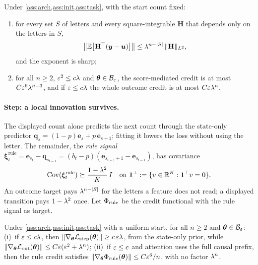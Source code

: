 \begin{lemma}
\label{thm:main}
Under \cref{ass:arch,ass:init,ass:task}, with the start count fixed:
\begin{enumerate}[label=(\roman*),leftmargin=*,itemsep=0pt,topsep=2pt]
\item for every set $S$ of letters and every square-integrable $\mathbf H$ that depends only on the letters in $S$,
\begin{equation}
 \bigl\|\mathbb E\bigl[\mathbf H^\top(\bm y-\bm u)\bigr]\bigr\|\le\lambda^{n-|S|}\,\|\mathbf H\|_{L^2},
 \label{eq:credit-degree}
\end{equation}
and the exponent is sharp;
\item for all $n\ge2$, $\varepsilon^2\le c\lambda$ and $\bm\theta\in\mathcal B_{\varepsilon}$, the score-mediated credit is at most $C\varepsilon^6\lambda^{n-3}$, and if
$\varepsilon\le c\lambda$ the whole outcome credit is at most $C\varepsilon\lambda^n$.
\end{enumerate}
\end{lemma}

\paragraph{Step: a local innovation survives.} The displayed count alone predicts the next count through the state-only predictor
$\bm q_s=(1-p)\bm e_s+p\,\bm e_{s+1}$; fitting it lowers the loss without using the letter. The remainder, the \emph{rule signal}
$\bm\xi^{\mathrm{rule}}_t=\bm e_{s_t}-\bm q_{s_{t-1}}=(b_t-p)(\bm e_{s_{t-1}+1}-\bm e_{s_{t-1}})$, has covariance
\begin{equation}
 \operatorname{Cov}(\bm\xi^{\mathrm{rule}}_t)\succeq\frac{1-\lambda^2}{K}\,I
 \quad\text{on }\mathbf 1^\perp:=\{v\in\mathbb R^K:\mathbf 1^\top v=0\}.
 \label{eq:local-variation}
\end{equation}
An outcome target pays $\lambda^{n-|S|}$ for the letters a feature does not read; a displayed transition pays $1-\lambda^2$ once. Let
$\Phi_{\mathrm{rule}}$ be the credit functional with the rule signal as target.

\begin{lemma}
\label{thm:separation}
Under \cref{ass:arch,ass:init,ass:task} with a uniform start, for all $n\ge2$ and $\bm\theta\in\mathcal B_{\varepsilon}$:
(i)~if $\varepsilon\le c\lambda$, then $\|\nabla_{\bm\theta}\mathcal L_{\mathrm{step}}(\bm\theta)\|\ge c\,\varepsilon\lambda$, from the state-only prior, while
$\|\nabla_{\bm\theta}\mathcal L_{\mathrm{out}}(\bm\theta)\|\le C\varepsilon(\varepsilon^2+\lambda^n)$;
(ii)~if $\varepsilon\le c$ and attention uses the full causal prefix, then the rule credit satisfies $\|\nabla_{\bm\theta}\Phi_{\mathrm{rule}}(\bm\theta)\|\le C\varepsilon^6/n$, with
no factor $\lambda^n$.
\end{lemma}

